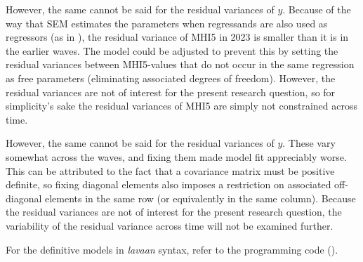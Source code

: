 However, the same cannot be said for the residual variances of $y$. Because of the way that SEM estimates the
parameters when regressands are also used as regressors (as in ),
the residual variance of MHI5 in 2023 is smaller than it is in the earlier waves. The model could be adjusted
to prevent this by setting the residual variances between MHI5-values that do not occur in the same regression as free
parameters (eliminating associated degrees of freedom). However, the residual variances are not of interest for the present
research question, so for simplicity's sake the residual variances of MHI5 are simply not constrained across time.

However, the same cannot be said for the residual variances of $y$.
These vary somewhat across the waves, and fixing them made model fit appreciably worse.
This can be attributed to the fact that a covariance matrix must be positive definite, so fixing diagonal
elements also imposes a restriction on associated off-diagonal elements in the same row (or equivalently
in the same column).
Because the residual variances are not of interest for the present research question, the variability of
the residual variance across time will not be examined further.

For the definitive models in \textit{lavaan} syntax, refer to the programming code ().
